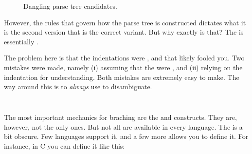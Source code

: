 \begin{figure}[tbp]
  
  \caption{Dangling  parse tree candidates.}
  \label{fig:flow:branch:dangling:parse}
\end{figure}

However, the rules that govern how the parse tree is constructed dictates what it is the second version that is the correct variant. But why exactly is that? The  is essentially .

The problem here is that the indentations were , and that likely fooled you. Two mistakes were made, namely (i) assuming that the  were , and (ii) relying on the indentation for understanding. Both mistakes are extremely easy to make. The way around this is to \textsl{always} use  to disambiguate.

\inputminted[linenos]{csharp}{../src/csharp/flow_branch/dangling_fixed/Program.cs}

\subsection{}

The most important mechanics for braching are the  and  constructs. They are, however, not the only ones. But not all are available in every language. The  is a bit obscure. Few languages support it, and a few more allows you to define it. For instance, in C you can define it like this:

\inputminted[firstline=3, lastline=3]{c}{../src/c/flow/unless/unless.c}

